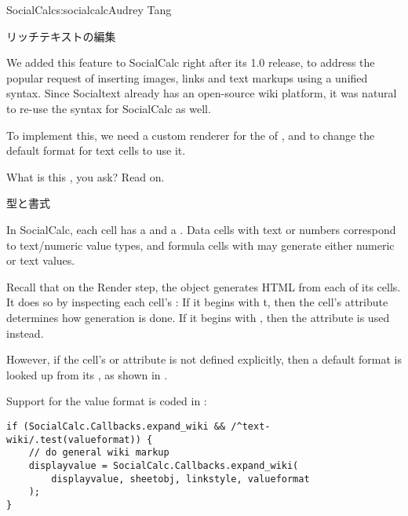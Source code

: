 \begin{aosachapter}{SocialCalc}{s:socialcalc}{Audrey Tang}
\begin{aosasect1}{リッチテキストの編集}

We added this feature to SocialCalc right after its 1.0 release, to
address the popular request of inserting images, links and text
markups using a unified syntax.  Since Socialtext already has an
open-source wiki platform, it was natural to re-use the syntax for
SocialCalc as well.

To implement this, we need a custom renderer for the
 of , and to change the default
format for text cells to use it.

What is this , you ask?  Read on.

\begin{aosasect2}{型と書式}

In SocialCalc, each cell has a  and a .
Data cells with text or numbers correspond to text/numeric value
types, and formula cells with  may generate either
numeric or text values.

Recall that on the Render step, the  object generates HTML
from each of its cells.  It does so by inspecting each cell's
: If it begins with t, then the cell's
 attribute determines how generation is done.
If it begins with , then the  attribute is
used instead.

However, if the cell's  or
 attribute is not defined explicitly, then a
default format is looked up from its , as shown in
.



\noindent Support for the  value format is coded in
:

\begin{verbatim}
if (SocialCalc.Callbacks.expand_wiki && /^text-wiki/.test(valueformat)) {
    // do general wiki markup
    displayvalue = SocialCalc.Callbacks.expand_wiki(
        displayvalue, sheetobj, linkstyle, valueformat
    );
}
\end{verbatim}


\end{aosasect2}
\end{aosasect1}
\end{aosachapter}
